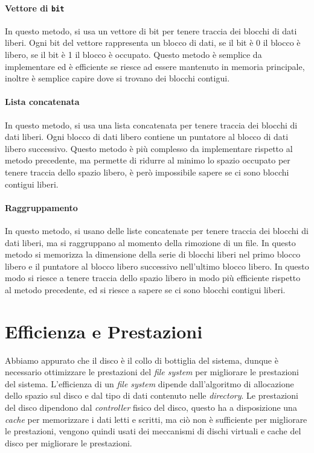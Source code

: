     \paragraph{Vettore di \texttt{bit}} In questo metodo, si usa un vettore di bit per tenere traccia dei blocchi di dati liberi. Ogni bit del vettore rappresenta un blocco di dati, se il bit è 0 il blocco è libero, se il bit è 1 il blocco è occupato. Questo metodo è semplice da implementare ed è efficiente se riesce ad essere mantenuto in memoria principale, inoltre è semplice capire dove si trovano dei blocchi contigui. 
    \paragraph{Lista concatenata} In questo metodo, si usa una lista concatenata per tenere traccia dei blocchi di dati liberi. Ogni blocco di dati libero contiene un puntatore al blocco di dati libero successivo. Questo metodo è più complesso da implementare rispetto al metodo precedente, ma permette di ridurre al minimo lo spazio occupato per tenere traccia dello spazio libero, è però impossibile sapere se ci sono blocchi contigui liberi.
    \paragraph{Raggruppamento} In questo metodo, si usano delle liste concatenate per tenere traccia dei blocchi di dati liberi, ma si raggruppano al momento della rimozione di un file. In questo metodo si memorizza la dimensione della serie di blocchi liberi nel primo blocco libero e il puntatore al blocco libero successivo nell'ultimo blocco libero. In questo modo si riesce a tenere traccia dello spazio libero in modo più efficiente rispetto al metodo precedente, ed si riesce a sapere se ci sono blocchi contigui liberi.
\section{Efficienza e Prestazioni}
    Abbiamo appurato che il disco è il collo di bottiglia del sistema, dunque è necessario ottimizzare le prestazioni del \textit{file system} per migliorare le prestazioni del sistema. L'efficienza di un \textit{file system} dipende dall'algoritmo di allocazione dello spazio sul disco e dal tipo di dati contenuto nelle \textit{directory}. Le prestazioni del disco dipendono dal \textit{controller} fisico del disco, questo ha a disposizione una \textit{cache} per memorizzare i dati letti e scritti, ma ciò non è sufficiente per migliorare le prestazioni, vengono quindi usati dei meccanismi di dischi virtuali e cache del disco per migliorare le prestazioni.
